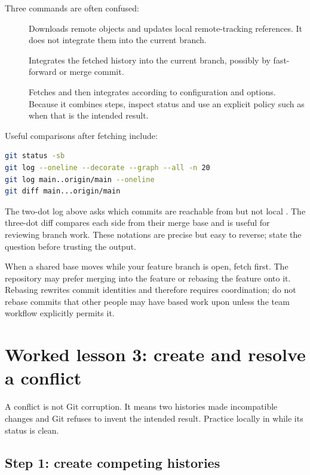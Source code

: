 Three commands are often confused:

\begin{description}
  \item[] Downloads remote objects and updates local
  remote-tracking references. It does not integrate them into the current branch.
  \item[] Integrates the fetched 
  history into the current branch, possibly by fast-forward or merge commit.
  \item[] Fetches and then integrates according to configuration
  and options. Because it combines steps, inspect status and use an explicit
  policy such as  when that is the intended result.
\end{description}

Useful comparisons after fetching include:

\begin{lstlisting}[language=bash,numbers=none]
git status -sb
git log --oneline --decorate --graph --all -n 20
git log main..origin/main --oneline
git diff main...origin/main
\end{lstlisting}

The two-dot log above asks which commits are reachable from 
but not local . The three-dot diff compares each side from their
merge base and is useful for reviewing branch work. These notations are precise
but easy to reverse; state the question before trusting the output.

When a shared base moves while your feature branch is open, fetch first. The
repository may prefer merging  into the feature or rebasing
the feature onto it. Rebasing rewrites commit identities and therefore requires
coordination; do not rebase commits that other people may have based work upon
unless the team workflow explicitly permits it.

\section{Worked lesson 3: create and resolve a conflict}

A conflict is not Git corruption. It means two histories made incompatible
changes and Git refuses to invent the intended result. Practice locally in
 while its status is clean.

\subsection*{Step 1: create competing histories}

